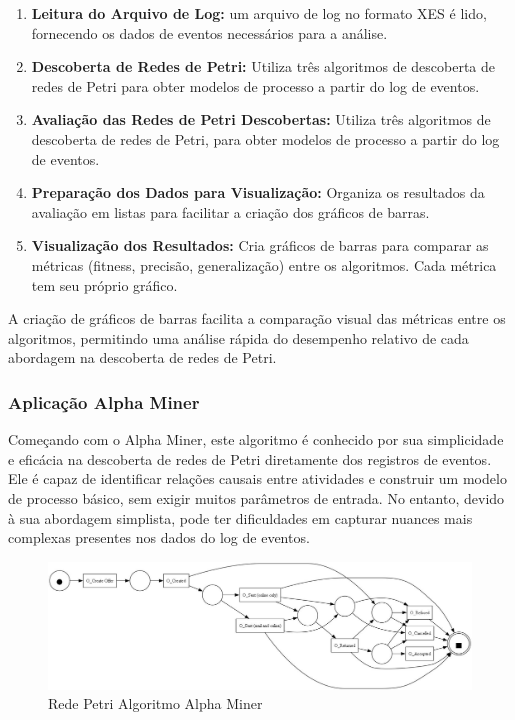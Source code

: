 \documentclass[tcc2]{classe_uftex/uftex}
\begin{document}
\begin{enumerate}
    \item \textbf{Leitura do Arquivo de Log:} um arquivo de log no formato XES é lido, fornecendo os dados de eventos necessários para a análise.
    
        \item \textbf {Descoberta de Redes de Petri:} Utiliza três algoritmos de descoberta de redes de Petri para obter modelos de processo a partir do log de eventos.
    
    \item \textbf{Avaliação das Redes de Petri Descobertas:} Utiliza três algoritmos de descoberta de redes de Petri, para obter modelos de processo a partir do log de eventos.
    

     \item \textbf{Preparação dos Dados para Visualização:} Organiza os resultados da avaliação em listas para facilitar a criação dos gráficos de barras.

      \item \textbf{Visualização dos Resultados:} Cria gráficos de barras para comparar as métricas (fitness, precisão, generalização) entre os algoritmos. Cada métrica tem seu próprio gráfico.
\end{enumerate}

 A criação de gráficos de barras facilita a comparação visual das métricas entre os algoritmos, permitindo uma análise rápida do desempenho relativo de cada abordagem na descoberta de redes de Petri.

\subsubsection{Aplicação Alpha Miner }
Começando com o Alpha Miner, este algoritmo é conhecido por sua simplicidade e eficácia na descoberta de redes de Petri diretamente dos registros de eventos. Ele é capaz de identificar relações causais entre atividades e construir um modelo de processo básico, sem exigir muitos parâmetros de entrada. No entanto, devido à sua abordagem simplista, pode ter dificuldades em capturar nuances mais complexas presentes nos dados do log de eventos.

\begin{figure}[h]
    \centering
    \includegraphics[width=12cm]{tcc_example/Alpha_miner.jpg}
    \caption{Rede Petri Algoritmo Alpha Miner}
\end{figure}
\end{document}
